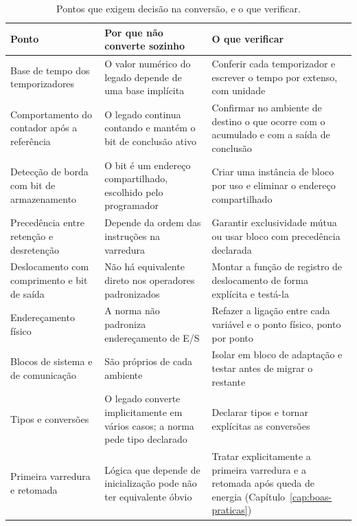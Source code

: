 \begin{table}[H]
  \centering
  \caption{Pontos que exigem decisão na conversão, e o que verificar.}
  \label{tab:nao-converte}
  \begin{tabular}{p{3.4cm} p{5.4cm} p{5.5cm}}
    \toprule
    Ponto & Por que não converte sozinho & O que verificar \\
    \midrule
    Base de tempo dos temporizadores
      & O valor numérico do legado depende de uma base implícita
      & Conferir cada temporizador e escrever o tempo por extenso, com unidade \\
    \addlinespace
    Comportamento do contador após a referência
      & O legado continua contando e mantém o bit de conclusão ativo
      & Confirmar no ambiente de destino o que ocorre com o acumulado e com a saída de conclusão \\
    \addlinespace
    Detecção de borda com bit de armazenamento
      & O bit é um endereço compartilhado, escolhido pelo programador
      & Criar uma instância de bloco por uso e eliminar o endereço compartilhado \\
    \addlinespace
    Precedência entre retenção e desretenção
      & Depende da ordem das instruções na varredura
      & Garantir exclusividade mútua ou usar bloco com precedência declarada \\
    \addlinespace
    Deslocamento com comprimento e bit de saída
      & Não há equivalente direto nos operadores padronizados
      & Montar a função de registro de deslocamento de forma explícita e testá-la \\
    \addlinespace
    Endereçamento físico
      & A norma não padroniza endereçamento de E/S
      & Refazer a ligação entre cada variável e o ponto físico, ponto por ponto \\
    \addlinespace
    Blocos de sistema e de comunicação
      & São próprios de cada ambiente
      & Isolar em bloco de adaptação e testar antes de migrar o restante \\
    \addlinespace
    Tipos e conversões
      & O legado converte implicitamente em vários casos; a norma pede tipo declarado
      & Declarar tipos e tornar explícitas as conversões \\
    \addlinespace
    Primeira varredura e retomada
      & Lógica que depende de inicialização pode não ter equivalente óbvio
      & Tratar explicitamente a primeira varredura e a retomada após queda de energia
        (Capítulo~\ref{cap:boas-praticas}) \\
    \bottomrule
  \end{tabular}
\end{table}

